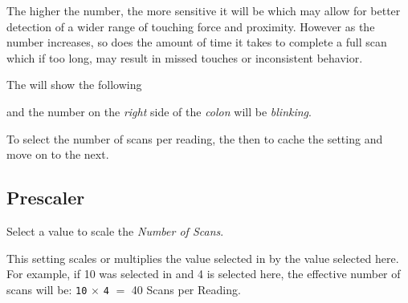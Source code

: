 \par\medskip

The higher the number, the more sensitive it will be which may allow for better
detection of a wider range of touching force and proximity.  However as the
number increases, so does the amount of time it takes to complete a full scan
which if too long, may result in missed touches or inconsistent behavior.

\par\medskip


\par\medskip

The  will show the following


and the number on the \textit{right} side of the \textit{colon} will be
\textit{blinking}.

\par\medskip

To select the number of scans per reading,  the  then 
to cache the setting and move on to the next.


\subsection{Prescaler} 

Select a value to scale the \textit{Number of Scans}.

\par\medskip

This setting scales or multiplies the value selected in  by the value
selected here.  For example, if \num{10} was selected in  and \num{4}
is selected here, the effective number of scans will be:
\texttt{10} \textbf{$\times$} \texttt{4} $=$ \num{40} Scans per Reading.

